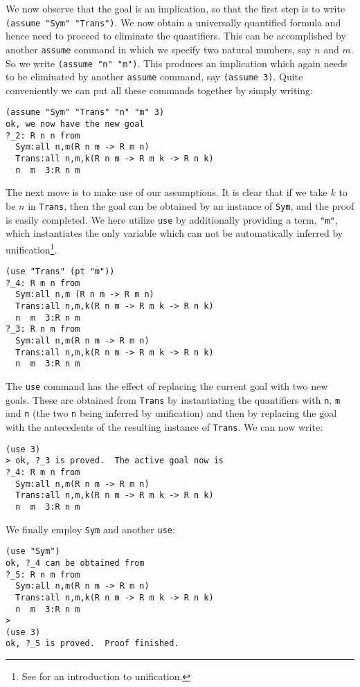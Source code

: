 \documentclass[12pt]{amsart}
\begin{document}
We now observe that the goal is an implication, so that the first step
is to write \texttt{(assume "Sym" "Trans")}.  We now obtain a
universally quantified formula and hence need to proceed to eliminate
the quantifiers. This can be accomplished by another \texttt{assume}
command in which we specify two natural numbers, say $n$ and $m$.  So
we write \texttt{(assume "n" "m")}.  This produces an implication
which again needs to be eliminated by another \texttt{assume} command,
say \texttt{(assume 3)}.  Quite conveniently we can put all these
commands together by simply writing:
\begin{verbatim}
(assume "Sym" "Trans" "n" "m" 3)
ok, we now have the new goal
?_2: R n n from
  Sym:all n,m(R n m -> R m n)
  Trans:all n,m,k(R n m -> R m k -> R n k)
  n  m  3:R n m
\end{verbatim}

The next move is to make use of our assumptions.  It is clear that if
we take $k$ to be $n$ in \texttt{Trans}, then the goal can be obtained
by an instance of \texttt{Sym}, and the proof is easily completed.
We here utilize \texttt{use} by additionally providing a term,
\texttt{"m"}, which instantiates the only variable which can not be
automatically inferred by unification\footnote{See \cite{tcf} for an
  introduction to unification.}.
\begin{verbatim}
(use "Trans" (pt "m"))
?_4: R m n from
  Sym:all n,m (R n m -> R m n)
  Trans:all n,m,k(R n m -> R m k -> R n k)
  n  m  3:R n m
?_3: R n m from
  Sym:all n,m(R n m -> R m n)
  Trans:all n,m,k(R n m -> R m k -> R n k)
  n  m  3:R n m
\end{verbatim}

The \texttt{use} command has the effect of replacing the current goal
with two new goals.  These are obtained from \texttt{Trans} by
instantiating the quantifiers with \texttt{n}, \texttt{m} and
\texttt{n} (the two \texttt{n} being inferred by unification) and then
by replacing the goal with the antecedents of the resulting instance
of \texttt{Trans}.  We can now write:
\begin{verbatim}
(use 3)
> ok, ?_3 is proved.  The active goal now is
?_4: R m n from
  Sym:all n,m(R n m -> R m n)
  Trans:all n,m,k(R n m -> R m k -> R n k)
  n  m  3:R n m
\end{verbatim}

We finally employ \texttt{Sym} and another \texttt{use}:
\begin{verbatim}
(use "Sym")
ok, ?_4 can be obtained from
?_5: R n m from
  Sym:all n,m(R n m -> R m n)
  Trans:all n,m,k(R n m -> R m k -> R n k)
  n  m  3:R n m
>
(use 3)
ok, ?_5 is proved.  Proof finished.
\end{verbatim}
\end{document}
